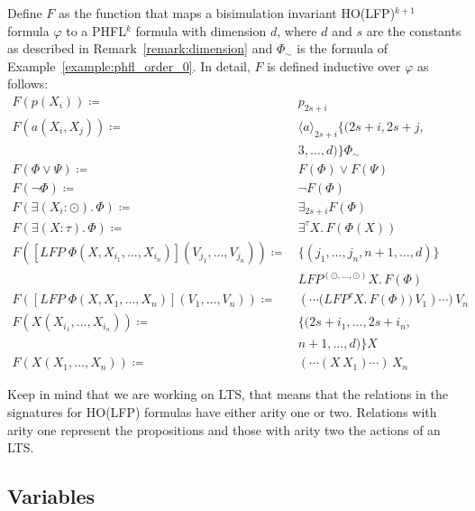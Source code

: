 \begin{definition}
    \label{definition:lower_bounds_phfl_formula_function}
   Define $F$ as the function that maps a bisimulation invariant HO(LFP)$^{k+1}$ formula $\varphi$ to a PHFL$^k$ formula with dimension $d$, where $d$ and $s$ are the constants as described in Remark~\ref{remark:dimension} and $\Phi_\sim$ is the formula of Example~\ref{example:phfl_order_0}. In detail, $F$ is defined
    inductive over $\varphi$ as follows:
    \begin{align*}
        F(p(X_i)) \coloneqq &\, p_{2s+i} \\
        F(a(X_i, X_j)) \coloneqq &\, \langle a \rangle_{2s+i} \{(2s+i, 2s+j, \\
        &\,3, \dots, d)\} \Phi_\sim \\
        F(\Phi \vee \Psi) \coloneqq &\, F(\Phi) \vee F(\Psi) \\
        F(\neg \Phi) \coloneqq &\, \neg F(\Phi) \\
        F(\exists (X_i \colon \odot).\,\Phi) \coloneqq &\, \exists_{2s+i} F(\Phi) \\
        F(\exists (X \colon \tau).\,\Phi) \coloneqq &\, \exists^\tau X.\,F(\Phi(X)) \\
        F([LFP\;\Phi(X, X_{i_1}, \dots, X_{i_n})](V_{j_1}, \dots, V_{j_n})) \coloneqq &\,\{(j_1, \dots, j_n, n + 1, \dots, d)\} \\
        &\,LFP^{(\odot, \dots, \odot)} X.\, F(\Phi) \\
        F([LFP\;\Phi(X, X_1, \dots, X_n)](V_1, \dots, V_n)) \coloneqq &\,(\dotsb \big(LFP^\tau X.\, F(\Phi)\big)\,V_1)\dotsb)\,V_n \\
        F(X(X_{i_1}, \dots, X_{i_n})) \coloneqq &\, \{(2s+i_1, \dots, 2s+i_n, \\
        &\,n + 1, \dots, d)\}X\\
        F(X(X_1, \dots, X_n)) \coloneqq &\, (\dotsb (X\,X_1)\dotsb)\,X_n
    \end{align*}
\end{definition}
Keep in mind that we are working on LTS, that means that the relations in the signatures for HO(LFP) formulas have either arity one or two. Relations with arity one represent the 
propositions and those with arity two the actions of an LTS.

\subsection{Variables}\label{subsec:lower_bounds_variables}

